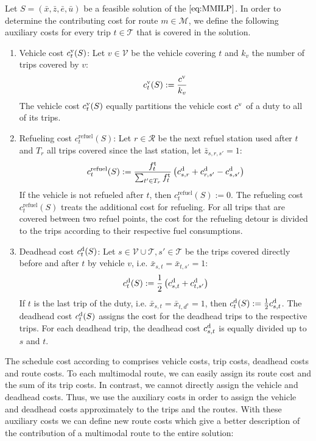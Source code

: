 Let $S=\left(\bar{x},\bar{z},\bar{e},\bar{u}\right)$ be a feasible solution of the $\eqref{eq:MMILP}$. In order to determine the contributing cost for route $m\in\mathcal{M}$, we define the following auxiliary costs for every trip $t\in\mathcal{T}$ that is covered in the solution. 
\begin{enumerate}
	\item{Vehicle cost $c^{\operatorname{v}}_t(S)$:}
Let $v\in\mathcal{V}$ be the vehicle covering $t$ and $k_v$ the number of trips covered by $v$:
\begin{align*}
	c^{\operatorname{v}}_t(S) := \frac{c^{\operatorname{v}}}{k_v}
\end{align*}
The vehicle cost $c^{\operatorname{v}}_t(S)$ equally partitions the vehicle cost $c^{\operatorname{v}}$ of a duty to all of its trips.
	\item{Refueling cost $c^{\operatorname{refuel}}_t(S)$:}
Let $r\in\mathcal{R}$ be the next refuel station used after $t$ and $T_r$ all trips covered since the last station, let $\bar{z}_{s,r,s'} = 1$:
\begin{align*}
	c^{\operatorname{refuel}}_t(S) := \frac{f^{\operatorname{t}}_t}{\sum_{t'\in T_r} f^{\operatorname{t}}_t}\left(c^{\operatorname{d}}_{s,r}+c^{\operatorname{d}}_{r,s'}-c^{\operatorname{d}}_{s,s'}\right)
\end{align*}
If the vehicle is not refueled after $t$, then $c^{\operatorname{refuel}}_t(S) := 0$. The refueling cost $c^{\operatorname{refuel}}_t(S)$ treats the additional cost for refueling. For all trips that are covered between two refuel points, the cost for the refueling detour is divided to the trips according to their respective fuel consumptions.
	\item{Deadhead cost $c^{\operatorname{d}}_t(S)$:}
Let $s\in\mathcal{V}\cup\mathcal{T},s'\in\mathcal{T}$ be the trips covered directly before and after $t$ by vehicle $v$, i.e. $\bar{x}_{s,t}=\bar{x}_{t,s'}=1$:
\begin{align*}
	c^{\operatorname{d}}_t(S) := \frac 1 2 \left(c^{\operatorname{d}}_{s,t}+c^{\operatorname{d}}_{t,s'}\right)
\end{align*}
If $t$ is the last trip of the duty, i.e. $\bar{x}_{s,t}=\bar{x}_{t,d^{\operatorname{e}}}=1$, then $c^{\operatorname{d}}_t(S) := \frac 1 2 c^{\operatorname{d}}_{s,t}$. The deadhead cost $c^{\operatorname{d}}_t(S)$ assigns the cost for the deadhead trips to the respective trips. For each deadhead trip, the deadhead cost $c^{\operatorname{d}}_{s,t}$ is equally divided up to $s$ and $t$.
\end{enumerate}

The schedule cost according to  comprises vehicle costs, trip costs, deadhead costs and route costs. To each multimodal route, we can easily assign its route cost and the sum of its trip costs. In contrast, we cannot directly assign the vehicle and deadhead costs. Thus, we use the auxiliary costs in order to assign the vehicle and deadhead costs approximately to the trips and the routes. With these auxiliary costs we can define new route costs which give a better description of the contribution of a multimodal route to the entire solution:


